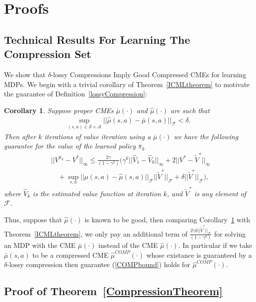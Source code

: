 \documentclass[letterpaper]{article}
\newtheorem{corollary}[theorem]{Corollary}
\newcommand{\cF}{{\mathcal F}}
\newcommand{\cA}{{\mathcal A}}
\newcommand{\cS}{{\mathcal S}}
\newcommand{\nn}{\nonumber}
\begin{document}
\section{Proofs}

\subsection{Technical Results For Learning The Compression Set} \label{learningCompressionAppendix}

We show that $\delta$-lossy Compressions Imply Good Compressed CMEs for learning MDPs. We begin with a trivial corollary of Theorem~\ref{ICMLtheorem} to motivate the guarantee of Definition~\ref{lossyCompression}:

\begin{corollary} \label{ICMLcorollary}
Suppose proper CMEs $\bar\mu(\cdot)$ and $\hat\mu(\cdot)$ are such that
\begin{align}
\sup_{(s,a)\in\cS\times\cA}||\hat\mu(s,a) - \bar\mu(s,a)||_\cF < \delta.
\end{align}
Then after $k$ iterations of value iteration using a  $\bar\mu(\cdot)$ we have the following guarantee for the value of the learned policy $\bar\pi_k$
\begin{align}
&||V^{\bar\pi_k} - V^*||_{\infty}\le \frac{2\gamma}{(1-\gamma^2)}\Big( \gamma^k ||\hat V_1 - \hat V_0||_{\infty} + 2|| V^* - \tilde V^* ||_{\infty}  \nn\\
&\quad+\sup_{s,a} ||\mu(s,a) - \hat\mu(s,a)||_{\cF}||\tilde V^*||_{\cF} + \delta||\tilde V^*||_{\cF} \Big), \label{COMPbound}
\end{align}
where $\hat V_k$ is the estimated value function at iteration $k$, and $\tilde V^*$ is any element of $\cF$.
\end{corollary}
Thus, suppose that $\hat\mu(\cdot)$ is known to be good, then comparing Corollary~\ref{ICMLcorollary} with Theorem~\ref{ICMLtheorem}, we only pay an additional term of $\frac{2\gamma \delta||\tilde V^*||_{\cF}}{(1-\gamma^2)}$ for solving an MDP with the CME $\bar\mu(\cdot)$ instead of the CME $\hat\mu(\cdot)$. In particular if we take $\bar\mu(s,a)$ to be a compressed CME $\hat \mu^{COMP}(\cdot)$ whose existance is guaranteed by a $\delta$-lossy compression then guarantee (\ref{COMPbound}) holds for $\hat \mu^{COMP}(\cdot)$.

\subsection{Proof of Theorem~\ref{CompressionTheorem}}
\end{document}

